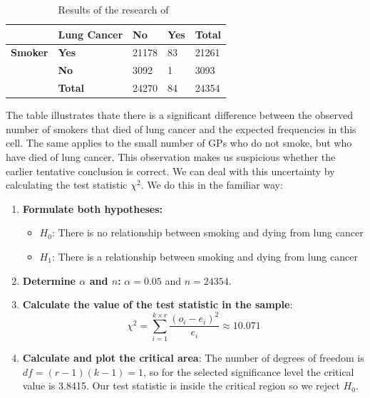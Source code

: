 \begin{table}
  \begin{center}
    \begin{tabular}{@{}lllll@{}}
    	\toprule
    	                & \textbf{Lung Cancer} & \textbf{No} & \textbf{Yes} & \textbf{Total} \\
    	\midrule
    	\textbf{Smoker} & \textbf{Yes}         & 21178       & 83           & 21261           \\
    	                & \textbf{No}          & 3092        & 1            & 3093            \\
    	                & \textbf{Total}       & 24270       & 84           & 24354           \\
    	\bottomrule
    \end{tabular}
  \end{center}
  \caption{Results of the research of~\textcite{Doll1954}}
  \label{tab:dollhill}
\end{table}

The table illustrates thate there is a significant difference between the observed number of smokers that died of lung cancer and the expected frequencies in this cell. The same applies to the small number of GPs who do not smoke, but who have died of lung cancer. This observation makes us suspicious whether the earlier tentative conclusion is correct. We can deal with this uncertainty by calculating the test statistic $\chi^{2}$. We do this in the familiar way:

\begin{enumerate}
  \item \textbf{Formulate both hypotheses:}
  \begin{itemize}
    \item $H_{0}$: There is no relationship between smoking and dying from lung cancer
    \item $H_{1}$: There is a relationship between smoking and dying from lung cancer
  \end{itemize}
  \item \textbf{Determine $\alpha$ and $n$:} $\alpha = 0.05$ and $n = 24354$.
  \item \textbf{Calculate the value of the test statistic in the sample}:
  \[ \chi^{2} = \sum_{i=1}^{k \times r} \frac{(o_{i} - e_{i})^{2}}{e_{i}} \approx 10.071 \]
  \item \textbf{Calculate and plot the critical area}: The number of degrees of freedom is $df = (r-1)(k-1) = 1$, so for the selected significance level the critical value is 3.8415. Our test statistic is inside the critical region so we reject $H_{0}$.
\end{enumerate}


